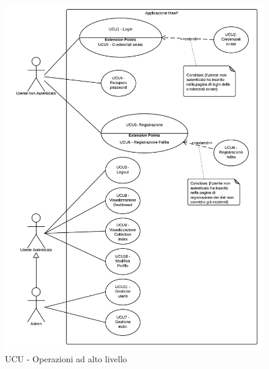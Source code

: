 		\begin{figure}[H]
    		\includegraphics[width=12cm]{UML/UCU - Operazioni ad alto livello.png}{\centering}
    		\caption{UCU - Operazioni ad alto livello}
		\end{figure}
			
